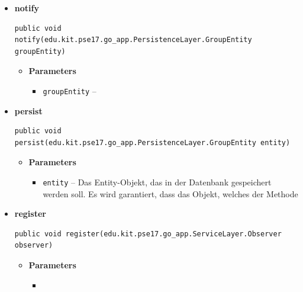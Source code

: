 \documentclass[11pt,a4paper]{report}
\begin{document}
{{{{{{{{{{{{{{\begin{itemize}
{\begin{itemize}
{}%
\end{itemize}
}%
\item{ 
\hypertarget{edu.kit.pse17.go_app.PersistenceLayer.daos.GroupDaoImp.notify(edu.kit.pse17.go_app.PersistenceLayer.GroupEntity)}{{\bf  notify}\\}
\begin{lstlisting}[frame=none]
public void notify(edu.kit.pse17.go_app.PersistenceLayer.GroupEntity groupEntity)\end{lstlisting} %
\begin{itemize}
\item{
{\bf  Parameters}
  \begin{itemize}
   \item{
\texttt{groupEntity} -- }
  \end{itemize}
}%
\end{itemize}
}%
\item{ 
\hypertarget{edu.kit.pse17.go_app.PersistenceLayer.daos.GroupDaoImp.persist(edu.kit.pse17.go_app.PersistenceLayer.GroupEntity)}{{\bf  persist}\\}
\begin{lstlisting}[frame=none]
public void persist(edu.kit.pse17.go_app.PersistenceLayer.GroupEntity entity)\end{lstlisting} %
\begin{itemize}
\item{
{\bf  Parameters}
  \begin{itemize}
   \item{
\texttt{entity} -- Das Entity-Objekt, das in der Datenbank gespeichert werden soll. Es wird garantiert, dass das Objekt, welches der Methode}
  \end{itemize}
}%
\end{itemize}
}%
\item{ 
\hypertarget{edu.kit.pse17.go_app.PersistenceLayer.daos.GroupDaoImp.register(edu.kit.pse17.go_app.ServiceLayer.Observer)}{{\bf  register}\\}
\begin{lstlisting}[frame=none]
public void register(edu.kit.pse17.go_app.ServiceLayer.Observer observer)\end{lstlisting} %
\begin{itemize}
\item{
{\bf  Parameters}
  \begin{itemize}
   \item{
}
\end{itemize}}
\end{itemize}}
\end{itemize}}}}}}}}}}}}}}}
\end{document}
